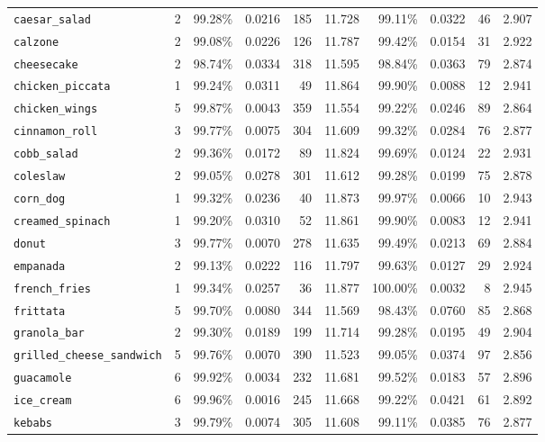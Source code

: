 \documentclass[10pt]{article}
\begin{document}
\begin{table}[htb]
{{\begin{tabularx}{\linewidth}{ l | r | r r r r | r r r r }
							\texttt{caesar\_salad} & 2 & 99.28\% & 0.0216 & 185 & 11.728 & 99.11\% & 0.0322 & 46 & 2.907 \\
							\texttt{calzone} & 2 & 99.08\% & 0.0226 & 126 & 11.787 & 99.42\% & 0.0154 & 31 & 2.922 \\
							\texttt{cheesecake} & 2 & 98.74\% & 0.0334 & 318 & 11.595 & 98.84\% & 0.0363 & 79 & 2.874 \\
							\texttt{chicken\_piccata} & 1 & 99.24\% & 0.0311 & 49 & 11.864 & 99.90\% & 0.0088 & 12 & 2.941 \\
							\texttt{chicken\_wings} & 5 & 99.87\% & 0.0043 & 359 & 11.554 & 99.22\% & 0.0246 & 89 & 2.864 \\
							\texttt{cinnamon\_roll} & 3 & 99.77\% & 0.0075 & 304 & 11.609 & 99.32\% & 0.0284 & 76 & 2.877 \\
							\texttt{cobb\_salad} & 2 & 99.36\% & 0.0172 & 89 & 11.824 & 99.69\% & 0.0124 & 22 & 2.931 \\
							\texttt{coleslaw} & 2 & 99.05\% & 0.0278 & 301 & 11.612 & 99.28\% & 0.0199 & 75 & 2.878 \\
							\texttt{corn\_dog} & 1 & 99.32\% & 0.0236 & 40 & 11.873 & 99.97\% & 0.0066 & 10 & 2.943 \\
							\texttt{creamed\_spinach} & 1 & 99.20\% & 0.0310 & 52 & 11.861 & 99.90\% & 0.0083 & 12 & 2.941 \\
							\texttt{donut} & 3 & 99.77\% & 0.0070 & 278 & 11.635 & 99.49\% & 0.0213 & 69 & 2.884 \\
							\texttt{empanada} & 2 & 99.13\% & 0.0222 & 116 & 11.797 & 99.63\% & 0.0127 & 29 & 2.924 \\
							\texttt{french\_fries} & 1 & 99.34\% & 0.0257 & 36 & 11.877 & 100.00\% & 0.0032 & 8 & 2.945 \\
							\texttt{frittata} & 5 & 99.70\% & 0.0080 & 344 & 11.569 & 98.43\% & 0.0760 & 85 & 2.868 \\
							\texttt{granola\_bar} & 2 & 99.30\% & 0.0189 & 199 & 11.714 & 99.28\% & 0.0195 & 49 & 2.904 \\
							\texttt{grilled\_cheese\_sandwich} & 5 & 99.76\% & 0.0070 & 390 & 11.523 & 99.05\% & 0.0374 & 97 & 2.856 \\
							\texttt{guacamole} & 6 & 99.92\% & 0.0034 & 232 & 11.681 & 99.52\% & 0.0183 & 57 & 2.896 \\
							\texttt{ice\_cream} & 6 & 99.96\% & 0.0016 & 245 & 11.668 & 99.22\% & 0.0421 & 61 & 2.892 \\
							\texttt{kebabs} & 3 & 99.79\% & 0.0074 & 305 & 11.608 & 99.11\% & 0.0385 & 76 & 2.877 \\

\end{tabularx}}}
\end{table}
\end{document}

